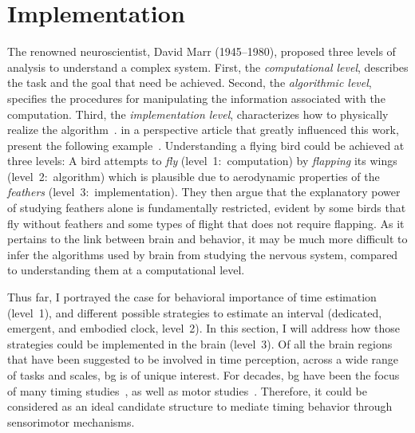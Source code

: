 \section{Implementation}
\label{ch:intro:implementation}
The renowned neuroscientist, David Marr (1945--1980), proposed three levels of analysis to understand a complex system.
First, the \emph{computational level}, describes the task and the goal that need be achieved.
Second, the \emph{algorithmic level}, specifies the procedures for manipulating the information associated with the computation.
Third, the \emph{implementation level}, characterizes how to physically realize the algorithm~\cite{Willshaw2015Marr}.
 in a perspective article that greatly influenced this work, present the following example~\cite{Krakauer2017Neuron}.
Understanding a flying bird could be achieved at three levels:
A bird attempts to \textit{fly} (level~1:~computation) by \textit{flapping} its wings (level~2:~algorithm) which is plausible due to aerodynamic properties of the \textit{feathers} (level~3:~implementation).
They then argue that the explanatory power of studying feathers alone is fundamentally restricted, evident by some birds that fly without feathers and some types of flight that does not require flapping.
As it pertains to the link between brain and behavior, it may be much more difficult to infer the algorithms used by brain from studying the nervous system, compared to understanding them at a computational level.
\par
Thus far, I portrayed the case for behavioral importance of time estimation (level~1), and different possible strategies to estimate an interval (dedicated, emergent, and embodied clock, level~2).
In this section, I will address how those strategies could be implemented in the brain (level~3).
Of all the brain regions that have been suggested to be involved in time perception\footnotemark, across a wide range of tasks and scales, \gls{bg} is of unique interest.
For decades, \gls{bg} have been the focus of many timing studies~\cite[see][]{Paton2018NeuronRev}, as well as motor studies~\cite[see][]{Turner2010CurrOpinNeurobiol}.
Therefore, it could be considered as an ideal candidate structure to mediate timing behavior through sensorimotor mechanisms.

